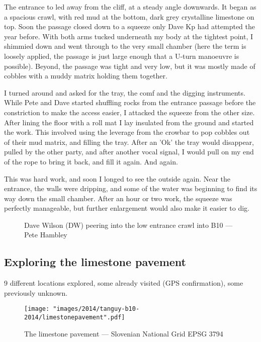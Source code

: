 The entrance to  led away from the cliff, at a steady angle downwards. It began as a spacious crawl, with red mud at the bottom, dark grey crystalline limestone on top. Soon the passage closed down to a squeeze only Dave Kp had attempted the year before. With both arms tucked underneath my body at the tightest point, I shimmied down and went through to the very small chamber (here the term is loosely applied, the passage is just large enough that a U-turn manoeuvre is possible). Beyond, the passage was tight and very low, but it was mostly made of cobbles with a muddy matrix holding them together. 

I turned around and asked for the tray, the comf and the digging instruments. While Pete and Dave started shuffling rocks from the entrance passage before the constriction to make the access easier, I attacked the squeeze from the other size. After lining the floor with a roll mat I lay insulated from the ground and started the work. This involved using the leverage from the crowbar to pop cobbles out of their mud matrix, and filling the tray. After an 'Ok' the tray would disappear, pulled by the other party, and after another vocal signal, I would pull on my end of the rope to bring it back, and fill it again. And again. 

This was hard work, and soon I longed to see the outside again. Near the entrance, the walls were dripping, and some of the water was beginning to find its way down the small chamber. After an hour or two work, the squeeze was perfectly manageable, but further enlargement would also make it easier to dig.

\begin{figure*}[t!]
	\checkoddpage \ifoddpage \forcerectofloat \else \forceversofloat \fi
	\centering
	\label{dw jailbreak}
	\caption{Dave Wilson (DW) peering into the low entrance crawl into B10 --- Pete Hambley}
\end{figure*}


\subsection{Exploring the limestone pavement}
9 different locations explored, some already visited (GPS confirmation), some previously unknown.

\begin{figure}[t!]
	\checkoddpage \ifoddpage \forcerectofloat \else \forceversofloat \fi
	\centering
	
	\texttt{[image: "images/2014/tanguy-b10-2014/limestonepavement".pdf]}
	
	\label{stalactites Atlantis}
	\caption{The limestone pavement --- Slovenian National Grid EPSG 3794}
\end{figure}


